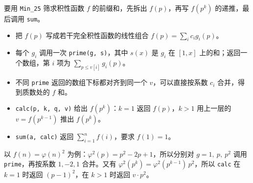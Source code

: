 要用 \texttt{Min\_25} 筛求积性函数 $f$ 的前缀和，先拆出 $f(p)$，再写 $f(p^k)$ 的递推，最后调用 \texttt{sum}。

\begin{itemize}
  \item 把 $f(p)$ 写成若干完全积性函数的线性组合 $f(p)=\sum_i c_i g_i(p)$。
  \item 每个 $g_i$ 调用一次 \texttt{prime(g, s)}，其中 $s(x)$ 是 $g_i$ 在 $[1,x]$ 上的和；返回一个数组，第 $i$ 项为 $\sum_{p\le v[i]} g_i(p)$。
  \item 不同 \texttt{prime} 返回的数组下标都对齐到同一个 $v$，可以直接按系数 $c_i$ 合并，得到质数处的 $f$ 和。
  \item \texttt{calc(p, k, q, v)} 给出 $f(p^k)$：$k=1$ 返回 $f(p)$，$k>1$ 用上一层的 $v=f(p^{k-1})$ 推出 $f(p^k)$。
  \item \texttt{sum(a, calc)} 返回 $\sum_{i=1}^n f(i)$，要求 $f(1)=1$。
\end{itemize}

以 $f(n)=\varphi(n)^2$ 为例：$\varphi^2(p)=p^2-2p+1$，所以分别对 $g=1,\ p,\ p^2$ 调用 \texttt{prime}，再按系数 $1,-2,1$ 合并。又有 $\varphi^2(p^k)=\varphi^2(p^{k-1})\,p^2$，所以 \texttt{calc} 在 $k=1$ 时返回 $(p-1)^2$，在 $k>1$ 时返回 $v\cdot p^2$。
